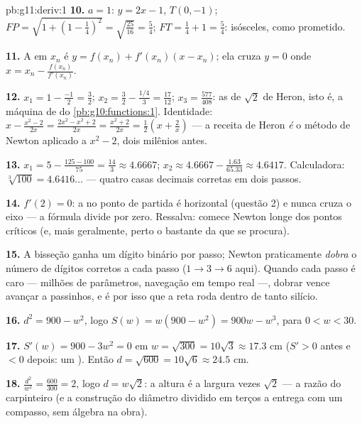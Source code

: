 \begin{solution}{pb:g11:deriv:1}
\textbf{10.} $a = 1$:  $y = 2x - 1$, $T(0, -1)$;
$FP = \sqrt{1 + \left(1 - \frac14\right)^2} =
\sqrt{\frac{25}{16}} = \frac54$; $FT = \frac14 + 1 = \frac54$:
isósceles, como prometido.

\textbf{11.} A  em $x_n$ é
$y = f(x_n) + f'(x_n)(x - x_n)$; ela cruza $y = 0$ onde
$x = x_n - \frac{f(x_n)}{f'(x_n)}$.

\textbf{12.} $x_1 = 1 - \frac{-1}{2} = \frac32$;
$x_2 = \frac32 - \frac{1/4}{3} = \frac{17}{12}$;
$x_3 = \frac{577}{408}$: as  de $\sqrt2$ de Heron,
isto é, a máquina de  do
\cref{pb:g10:functions:1}. Identidade:
$x - \frac{x^2 - 2}{2x} = \frac{2x^2 - x^2 + 2}{2x}
= \frac{x^2 + 2}{2x} = \frac12\left(x + \frac2x\right)$ --- a
receita de Heron \emph{é} o método de Newton aplicado a
$x^2 - 2$, dois milênios antes.

\textbf{13.} $x_1 = 5 - \frac{125 - 100}{75} = \frac{14}{3}
\approx 4.6667$; $x_2 \approx 4.6667 - \frac{1.63}{65.33}
\approx 4.6417$. Calculadora: $\sqrt[3]{100} = 4.6416\ldots$
--- quatro casas decimais corretas em dois passos.

\textbf{14.} $f'(2) = 0$: a  no ponto de partida é
horizontal (questão 2) e nunca cruza o eixo --- a fórmula
divide por zero. Ressalva: comece Newton longe dos pontos
críticos (e, mais geralmente, perto o bastante da  que se
procura).

\textbf{15.} A bisseção ganha um dígito binário por passo;
Newton praticamente \emph{dobra} o número de dígitos corretos a
cada passo ($1 \to 3 \to 6$ aqui). Quando cada passo é caro ---
milhões de parâmetros, navegação em tempo real ---, dobrar
vence avançar a passinhos, e é por isso que a reta 
roda dentro de tanto silício.

\textbf{16.} $d^2 = 900 - w^2$, logo
$S(w) = w(900 - w^2) = 900w - w^3$, para $0 < w < 30$.

\textbf{17.} $S'(w) = 900 - 3w^2 = 0$ em
$w = \sqrt{300} = 10\sqrt3 \approx 17.3$ cm ($S' > 0$ antes e
$< 0$ depois: um ). Então
$d = \sqrt{600} = 10\sqrt6 \approx 24.5$ cm.

\textbf{18.} $\frac{d^2}{w^2} = \frac{600}{300} = 2$, logo
$d = w\sqrt2$: a altura é a largura vezes $\sqrt2$ --- a razão
do carpinteiro (e a construção do diâmetro dividido em terços a
entrega com um compasso, sem álgebra na obra).


\end{solution}
